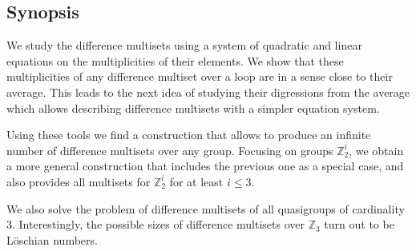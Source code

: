 \subsection{Synopsis}

	We study the difference multisets using a system of quadratic and 
	linear equations on the multiplicities of their elements. We show 
	that these multiplicities of any difference multiset over a loop 
	are in a sense close to their average. This leads to the next idea 
	of studying their digressions from the average which allows 
	describing difference multisets with a simpler equation system.

	Using these tools we find a construction that allows to produce an
	infinite number of difference multisets over any group. 
	Focusing on groups $\mathbb Z_2^i$, we obtain a more general 
	construction that includes the previous one as a special case, 
	and also provides all multisets for $\mathbb Z_2^i$ for at least 
	$i \leq 3$.

	We also solve the problem of difference multisets of all 
	quasigroups of cardinality 3. Interestingly, the possible sizes of 
	difference multisets over $\mathbb Z_3$ turn out to be Löschian 
	numbers.
    
